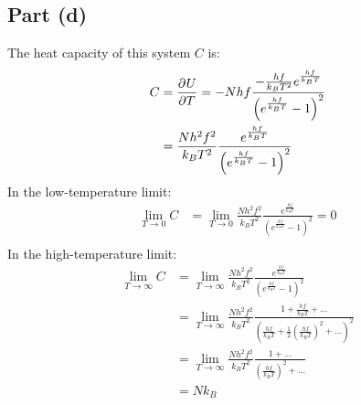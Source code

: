 \documentclass{article}
\begin{document}
\subsection*{Part (d)}
The heat capacity of this system $C$ is:
\begin{equation}
    \begin{split}
        C & = \frac{\partial^{}U} {\partial T^{}} = -Nhf\frac{-\frac{hf}{k_B T^2}e^{\frac{hf}{k_BT}}}{{\left(e^{\frac{hf}{k_BT}} - 1\right)}^2} \\
        & = \frac{Nh^2f^2}{k_BT^2}\frac{e^{\frac{hf}{k_BT}}}{{\left(e^{\frac{hf}{k_BT}} - 1\right)}^2} \\
    \end{split}
\end{equation}
In the low-temperature limit:
\begin{equation}
    \begin{split}
        \lim_{T \to 0} C & = \lim_{T \to 0} \frac{Nh^2f^2}{k_BT^2}\frac{e^{\frac{hf}{k_BT}}}{{\left(e^{\frac{hf}{k_BT}} - 1\right)}^2} = 0 \\
    \end{split}
\end{equation}
In the high-temperature limit:
\begin{equation}
    \begin{split}
        \lim_{T \to \infty} C & = \lim_{T \to \infty} \frac{Nh^2f^2}{k_BT^2}\frac{e^{\frac{hf}{k_BT}}}{{\left(e^{\frac{hf}{k_BT}} - 1\right)}^2} \\
        & = \lim_{T \to \infty} \frac{Nh^2f^2}{k_BT^2}\frac{1 + \frac{hf}{k_BT} + \ldots }{{\left(\frac{hf}{k_BT} + \frac{1}{2}{\left(\frac{hf}{k_BT}\right)}^2 + \ldots \right)}^2} \\
        & = \lim_{T \to \infty} \frac{Nh^2f^2}{k_BT^2}\frac{1 + \ldots}{{\left(\frac{hf}{k_BT}\right)}^2 + \ldots} \\
        & = Nk_B \\
    \end{split}
\end{equation}

\clearpage
\end{document}

